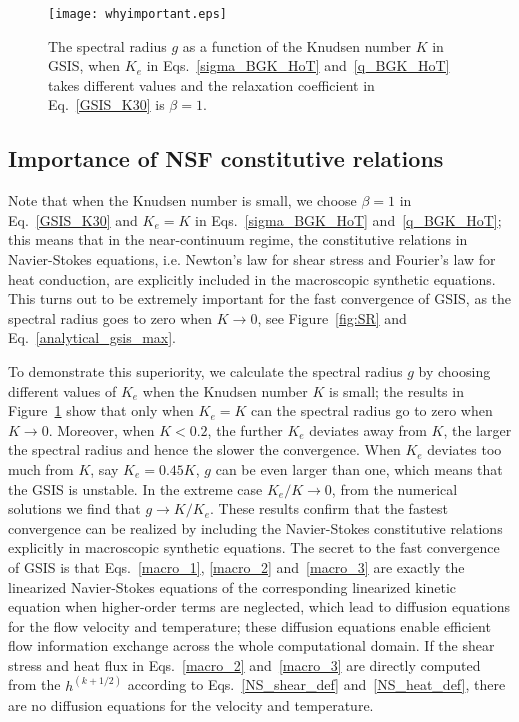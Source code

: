 \begin{figure}[t]
	\centering
	\texttt{[image: whyimportant.eps]}
	\caption{ The spectral radius ${g}$ as a function of the Knudsen number $K$ in GSIS, when $K_e$ in Eqs.~\eqref{sigma_BGK_HoT} and~\eqref{q_BGK_HoT} takes different values and the relaxation coefficient  in Eq.~\eqref{GSIS_K30} is $\beta=1$. }
	\label{fig:whyimportant}
\end{figure}




\subsection{Importance of NSF constitutive relations}\label{sec:whyimportant}

Note that when the Knudsen number is small, we choose $\beta=1$ in Eq.~\eqref{GSIS_K30} and $K_e=K$ in Eqs.~\eqref{sigma_BGK_HoT} and~\eqref{q_BGK_HoT}; this means that in the near-continuum regime, the constitutive relations in Navier-Stokes equations, i.e. Newton's law for shear stress and Fourier's law for heat conduction, are explicitly included in the macroscopic synthetic equations. This turns out to be extremely important for the fast convergence of GSIS, as the spectral radius goes to zero when $K\rightarrow0$, see Figure~\ref{fig:SR} and Eq.~\eqref{analytical_gsis_max}.


To demonstrate this superiority, we calculate the spectral radius ${g}$ by choosing different values of $K_e$ when the Knudsen number $K$ is small; the results in Figure~\ref{fig:whyimportant} show that only when $K_e=K$ can the spectral radius go to zero when $K\rightarrow0$. Moreover, when $K<0.2$, the further  $K_e$ deviates away from $K$, the larger the spectral radius and hence the slower the convergence. When $K_e$ deviates too much from $K$, say $K_e=0.45K$, ${g}$ can be even larger than one, which means that the GSIS is unstable. In the extreme case $K_e/K\rightarrow0$, from the numerical solutions we find that ${g}\rightarrow{K/K_e}$. These results confirm that the fastest convergence can be realized by including the Navier-Stokes constitutive relations explicitly in macroscopic synthetic equations. The secret to the fast convergence of GSIS is that Eqs.~\eqref{macro_1}, \eqref{macro_2} and~\eqref{macro_3} are exactly the linearized Navier-Stokes equations of the corresponding linearized kinetic equation when higher-order terms are neglected, which lead to diffusion equations for the flow velocity and temperature; these diffusion equations enable efficient flow information exchange across the whole computational domain. If the shear stress and heat flux in Eqs.~\eqref{macro_2} and~\eqref{macro_3} are directly computed from the $h^{(k+1/2)}$ according to Eqs.~\eqref{NS_shear_def} and~\eqref{NS_heat_def},  there are no diffusion equations for the velocity and temperature. 


